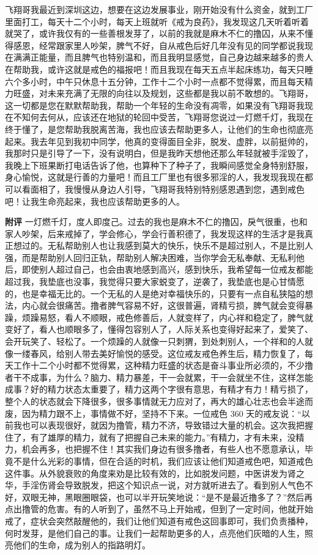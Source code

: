 \begin{case}
    飞翔哥我最近到深圳这边，想要在这边发展事业，刚开始没有什么资金，就到工厂里面打工，每天十二个小时，每天上班就听《戒为良药》，我发现这几天听着听着就哭了，或许我仅有的一些善根发芽了，以前的我就是麻木不仁的撸囚，从来不懂得感恩，经常跟家里人吵架，脾气不好，自从戒色后好几年没有见的同学都说我现在满满正能量，而且脾气也特别温和，而且我明显感觉，自己身边越来越多的贵人在帮助我，或许这就是戒色的福报吧！而且我现在每天五点半起床练功，每天只睡六个多小时，中午只休息十五分钟，工作十二个小时一点都不觉得累，而且每天精力旺盛，对未来充满了无限的向往以及规划，这些都是我以前不敢想的。飞翔哥，这一切都是您在默默帮助我，帮助一个年轻的生命没有凋零，如果没有飞翔哥我现在不知何去何从，应该还在地狱的轮回中受苦，飞翔哥您说过一灯燃千灯，我现在终于懂了，是您帮助我脱离苦海，我也应该去帮助更多人，让他们的生命也彻底亮起来。我去年见到我初中同学，他真的变得面目全非，脱发、虚胖，以前挺帅的，我那时只是引导了一下，没有说明白，但是我昨天想他还那么年轻就被手淫毁了，我晚上下班果断打电话告诉了他，也算种下了种子了，我瞬间感觉全身特别舒服，身心愉悦，这就是行善的力量吧！而且工厂里也有很多邪淫的人，我发现我现在都可以看面相了，我慢慢从身边人引导，飞翔哥我特别特别感恩遇到您，遇到戒色吧！让我生命亮起来，我也应该帮助更多的人。

    \textbf{附评} 一灯燃千灯，度人即度己。过去的我也是麻木不仁的撸囚，戾气很重，也和家人吵架，后来戒掉了，学会修心，学会行善积德了，我发现这样的生活才是我真正想过的。无私帮助别人也让我感到莫大的快乐，快乐不是超过别人，不是比别人强，而是帮助别人回归正轨，帮助别人解决困难，当你学会无私奉献、无私利他后，即使别人超过自己，也会由衷地感到高兴，感到快乐，我希望每一位戒友都能超过我，我垫底也没事，我觉得只要大家蜕变了，逆袭了，我垫底也是心甘情愿的，也是幸福无比的。一个无私的人是绝对幸福快乐的，只要有一点自私狭隘的想法，内心就会很痛苦。撸者脾气容易不好，这很普遍，肾精亏损，脾气就会变得暴躁，烦躁易怒，看人不顺眼，戒色修善后，人就变样了，内心祥和稳定了，脾气就变好了，看人也顺眼多了，懂得包容别人了，人际关系也变得好起来了，爱笑了、会开玩笑了、轻松了。一个烦躁的人就像一只刺猬，到处刺别人，一个祥和的人就像一缕春风，给别人带去美好愉悦的感受。这位戒友戒色养生后，精力恢复了，每天工作十二个小时都不觉得累，这种精力旺盛的状态是奋斗事业所必须的，不少撸者干不成事，为什么？脑力、精力暴差，干一会就累，干一会就坐不住，这样怎能成事？好的精力状态太重要了，精力这两个字很有意思，有精才有力！精亏损了，整个人的状态就会下降很多，很多事情就无力应对了，再大的雄心壮志也会半途而废，因为精力跟不上，事情做不好，坚持不下来。一位戒色 360 天的戒友说：“以前我也可以表现很好，就因为撸管，精力不济，导致错过大量的机会。这次我把握住了，有了雄厚的精力，就有了把握自己未来的能力。”有精力，才有未来，没精力，机会再多，也把握不住！其实我们身边有很多撸者，有些人也不愿意承认，毕竟不是什么光彩的事情，但在合适的时机，我们应该让他们知道戒色吧，知道戒色这件事。从外貌衰败的角度来劝是比较有效的，比如脱发问题，中医讲发为肾之华，手淫伤肾会导致脱发，把这个知识点一说，对方就听进去了。看到别人气色不好，双眼无神，黑眼圈眼袋，也可以半开玩笑地说：“是不是最近撸多了？”然后再点出撸管的危害。有的人听到了，虽然不马上开始戒，但到了一定时间，他就开始戒了，症状会突然敲醒他的，我们让他们知道有戒色这回事即可，我们负责播种，何时发芽，是他们自己的事。让我们一起帮助更多的人，点亮他们灰暗的人生，照亮他们的生命，成为别人的指路明灯。
\end{case}

